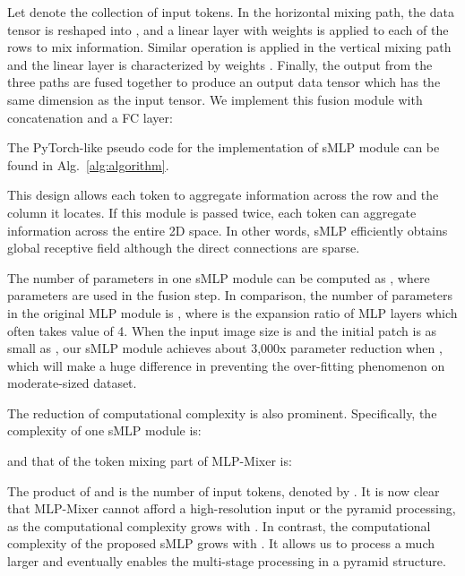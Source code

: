\documentclass[letterpaper]{article} \usepackage{aaai22}  \usepackage{times}  \usepackage{helvet}  \usepackage{courier}  \usepackage[hyphens]{url}  \usepackage{graphicx} \usepackage{color}
\begin{document}
Let  denote the collection of input tokens. In the horizontal mixing path, the data tensor is reshaped into , and a linear layer with weights  is applied to each of the  rows to mix information. Similar operation is applied in the vertical mixing path and the linear layer is characterized by weights . Finally, the output from the three paths are fused together to produce an output data tensor which has the same dimension as the input tensor. We implement this fusion module with concatenation and a FC layer:

The PyTorch-like pseudo code for the implementation of sMLP module can be found in Alg.~\ref{alg:algorithm}. 




This design allows each token to aggregate information across the row and the column it locates. If this module is passed twice, each token can aggregate information across the entire 2D space. In other words, sMLP efficiently obtains global receptive field although the direct connections are sparse. 

The number of parameters in one sMLP module can be computed as , where  parameters are used in the fusion step. In comparison, the number of parameters in the original MLP module is , where  is the expansion ratio of MLP layers which often takes value of 4. When the input image size is  and the initial patch is as small as , our sMLP module achieves about 3,000x parameter reduction when  , which will make a huge difference in preventing the over-fitting phenomenon on moderate-sized dataset. 

The reduction of computational complexity is also prominent. Specifically, the complexity of one sMLP module is:

and that of the token mixing part of MLP-Mixer is:

The product of  and  is the number of input tokens, denoted by . It is now clear that MLP-Mixer cannot afford a high-resolution input or the pyramid processing, as the computational complexity grows with . In contrast, the computational complexity of the proposed sMLP grows with . It allows us to process a much larger  and eventually enables the multi-stage processing in a pyramid structure.
\end{document}
